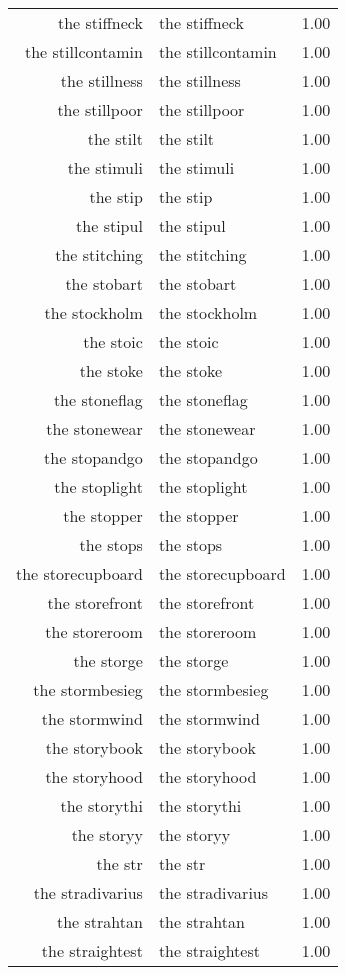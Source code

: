 \begin{table}[ht]
\begin{tabular}{rlr}
  the stiffneck & the stiffneck & 1.00 \\ 
  the stillcontamin & the stillcontamin & 1.00 \\ 
  the stillness & the stillness & 1.00 \\ 
  the stillpoor & the stillpoor & 1.00 \\ 
  the stilt & the stilt & 1.00 \\ 
  the stimuli & the stimuli & 1.00 \\ 
  the stip & the stip & 1.00 \\ 
  the stipul & the stipul & 1.00 \\ 
  the stitching & the stitching & 1.00 \\ 
  the stobart & the stobart & 1.00 \\ 
  the stockholm & the stockholm & 1.00 \\ 
  the stoic & the stoic & 1.00 \\ 
  the stoke & the stoke & 1.00 \\ 
  the stoneflag & the stoneflag & 1.00 \\ 
  the stonewear & the stonewear & 1.00 \\ 
  the stopandgo & the stopandgo & 1.00 \\ 
  the stoplight & the stoplight & 1.00 \\ 
  the stopper & the stopper & 1.00 \\ 
  the stops & the stops & 1.00 \\ 
  the storecupboard & the storecupboard & 1.00 \\ 
  the storefront & the storefront & 1.00 \\ 
  the storeroom & the storeroom & 1.00 \\ 
  the storge & the storge & 1.00 \\ 
  the stormbesieg & the stormbesieg & 1.00 \\ 
  the stormwind & the stormwind & 1.00 \\ 
  the storybook & the storybook & 1.00 \\ 
  the storyhood & the storyhood & 1.00 \\ 
  the storythi & the storythi & 1.00 \\ 
  the storyy & the storyy & 1.00 \\ 
  the str & the str & 1.00 \\ 
  the stradivarius & the stradivarius & 1.00 \\ 
  the strahtan & the strahtan & 1.00 \\ 
  the straightest & the straightest & 1.00 \\ 

\end{tabular}
\end{table}
